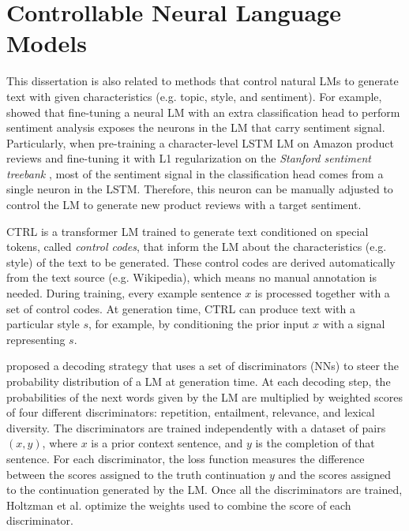 \section{Controllable Neural Language Models}
\label{sec:related_nlp}

This dissertation is also related to methods that control natural LMs to generate text with given characteristics (e.g. topic, style, and sentiment). For example, \citet{radford_2017} showed that fine-tuning a neural LM with an extra classification head to perform sentiment analysis exposes the neurons in the LM that carry sentiment signal. Particularly, when pre-training a character-level LSTM LM on Amazon product reviews \cite{He2016} and fine-tuning it with L1 regularization on the \textit{Stanford sentiment treebank} \cite{socher2013recursive}, most of the sentiment signal in the classification head comes from a single neuron in the LSTM. Therefore, this neuron can be manually adjusted to control the LM to generate new product reviews with a target sentiment.

CTRL \cite{keskar2019ctrl} is a transformer LM trained to generate text conditioned on special tokens, called \textit{control codes}, that inform the LM about the characteristics (e.g. style) of the text to be generated. These control codes are derived automatically from the text source (e.g. Wikipedia), which means no manual annotation is needed. During training, every example sentence $x$ is processed together with a set of control codes. At generation time, CTRL can produce text with a particular style $s$, for example, by conditioning the prior input $x$ with a signal representing $s$.


\citet{holtzman2018learning} proposed a decoding strategy that uses a set of discriminators (NNs) to steer the probability distribution of a LM at generation time. At each decoding step, the probabilities of the next words given by the LM are multiplied by weighted scores of four different discriminators: repetition, entailment, relevance, and lexical diversity. The discriminators are trained independently with a dataset of pairs $(x, y)$, where $x$ is a prior context sentence, and $y$ is the completion of that sentence. For each discriminator, the loss function measures the difference between the scores assigned to the truth continuation $y$ and the scores assigned to the continuation generated by the LM. Once all the discriminators are trained, Holtzman et al. \cite{holtzman2018learning} optimize the weights used to combine the score of each discriminator.

